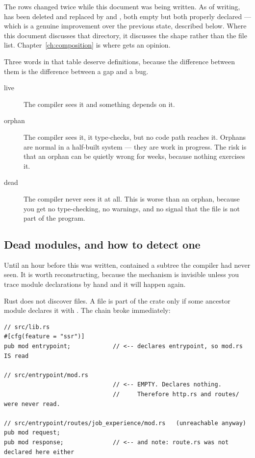 \begin{pitfall}
The  rows changed twice while this document was being written. As of writing,
 has been deleted and replaced by  and
, both empty but both properly declared --- which is a genuine
improvement over the previous state, described below. Where this document discusses that directory,
it discusses the shape rather than the file list. Chapter~\ref{ch:composition} is where
 gets an opinion.
\end{pitfall}

Three words in that table deserve definitions, because the difference between them is the
difference between a gap and a bug.

\begin{description}
  \item[live] The compiler sees it and something depends on it.
  \item[orphan] The compiler sees it, it type-checks, but no code path reaches it. Orphans are
    normal in a half-built system --- they are work in progress. The risk is that an orphan can
    be quietly wrong for weeks, because nothing exercises it.
  \item[dead] The compiler never sees it at all. This is worse than an orphan, because you get
    no type-checking, no warnings, and no signal that the file is not part of the program.
\end{description}

\subsection{Dead modules, and how to detect one}

Until an hour before this was written,  contained a subtree the compiler had
never seen. It is worth reconstructing, because the mechanism is invisible unless you trace module
declarations by hand and it will happen again.

Rust does not discover files. A file is part of the crate only if some ancestor module declares it
with . The chain broke immediately:

\begin{lstlisting}[style=rs,caption={The declaration chain as it was, traced.}]
// src/lib.rs
#[cfg(feature = "ssr")]
pub mod entrypoint;            // <-- declares entrypoint, so mod.rs IS read

// src/entrypoint/mod.rs
                               // <-- EMPTY. Declares nothing.
                               //     Therefore http.rs and routes/ were never read.

// src/entrypoint/routes/job_experience/mod.rs   (unreachable anyway)
pub mod request;
pub mod response;              // <-- and note: route.rs was not declared here either
\end{lstlisting}

